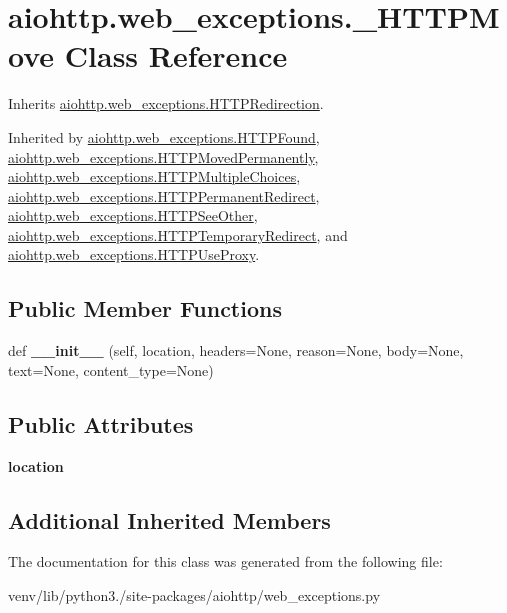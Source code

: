 \hypertarget{classaiohttp_1_1web__exceptions_1_1___h_t_t_p_move}{}\section{aiohttp.\+web\+\_\+exceptions.\+\_\+\+H\+T\+T\+P\+Move Class Reference}
\label{classaiohttp_1_1web__exceptions_1_1___h_t_t_p_move}


Inherits \hyperlink{classaiohttp_1_1web__exceptions_1_1_h_t_t_p_redirection}{aiohttp.\+web\+\_\+exceptions.\+H\+T\+T\+P\+Redirection}.



Inherited by \hyperlink{classaiohttp_1_1web__exceptions_1_1_h_t_t_p_found}{aiohttp.\+web\+\_\+exceptions.\+H\+T\+T\+P\+Found}, \hyperlink{classaiohttp_1_1web__exceptions_1_1_h_t_t_p_moved_permanently}{aiohttp.\+web\+\_\+exceptions.\+H\+T\+T\+P\+Moved\+Permanently}, \hyperlink{classaiohttp_1_1web__exceptions_1_1_h_t_t_p_multiple_choices}{aiohttp.\+web\+\_\+exceptions.\+H\+T\+T\+P\+Multiple\+Choices}, \hyperlink{classaiohttp_1_1web__exceptions_1_1_h_t_t_p_permanent_redirect}{aiohttp.\+web\+\_\+exceptions.\+H\+T\+T\+P\+Permanent\+Redirect}, \hyperlink{classaiohttp_1_1web__exceptions_1_1_h_t_t_p_see_other}{aiohttp.\+web\+\_\+exceptions.\+H\+T\+T\+P\+See\+Other}, \hyperlink{classaiohttp_1_1web__exceptions_1_1_h_t_t_p_temporary_redirect}{aiohttp.\+web\+\_\+exceptions.\+H\+T\+T\+P\+Temporary\+Redirect}, and \hyperlink{classaiohttp_1_1web__exceptions_1_1_h_t_t_p_use_proxy}{aiohttp.\+web\+\_\+exceptions.\+H\+T\+T\+P\+Use\+Proxy}.

\subsection*{Public Member Functions}
\begin{DoxyCompactItemize}
\item 
\mbox{\label{classaiohttp_1_1web__exceptions_1_1___h_t_t_p_move_a73c58e2c52a36fed990ff00867eb9a11}} 
def {\bfseries \+\_\+\+\_\+init\+\_\+\+\_\+} (self, location, headers=None, reason=None, body=None, text=None, content\+\_\+type=None)
\end{DoxyCompactItemize}
\subsection*{Public Attributes}
\begin{DoxyCompactItemize}
\item 
\mbox{\label{classaiohttp_1_1web__exceptions_1_1___h_t_t_p_move_a7a32fa31571eee3514139d6f810f5a08}} 
{\bfseries location}
\end{DoxyCompactItemize}
\subsection*{Additional Inherited Members}


The documentation for this class was generated from the following file\+:\begin{DoxyCompactItemize}
\item 
venv/lib/python3./site-\/packages/aiohttp/web\+\_\+exceptions.\+py\end{DoxyCompactItemize}
